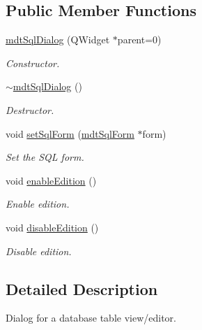 \subsection*{Public Member Functions}
\begin{DoxyCompactItemize}
\item 
\hypertarget{classmdt_sql_dialog_a9588f53afba818d79ff0f2e9eaeed50f}{
\hyperlink{classmdt_sql_dialog_a9588f53afba818d79ff0f2e9eaeed50f}{mdtSqlDialog} (QWidget $\ast$parent=0)}
\label{classmdt_sql_dialog_a9588f53afba818d79ff0f2e9eaeed50f}

\begin{DoxyCompactList}\small\item\em Constructor. \end{DoxyCompactList}\item 
\hypertarget{classmdt_sql_dialog_a845d9f4eef1c590d5e854540e18b00a6}{
\hyperlink{classmdt_sql_dialog_a845d9f4eef1c590d5e854540e18b00a6}{$\sim$mdtSqlDialog} ()}
\label{classmdt_sql_dialog_a845d9f4eef1c590d5e854540e18b00a6}

\begin{DoxyCompactList}\small\item\em Destructor. \end{DoxyCompactList}\item 
void \hyperlink{classmdt_sql_dialog_aa4b143efbe21073e1668d75cdf262a39}{setSqlForm} (\hyperlink{classmdt_sql_form}{mdtSqlForm} $\ast$form)
\begin{DoxyCompactList}\small\item\em Set the SQL form. \end{DoxyCompactList}\item 
void \hyperlink{classmdt_sql_dialog_a47de595aa2a117cdc3eb5de4a6bbf8f5}{enableEdition} ()
\begin{DoxyCompactList}\small\item\em Enable edition. \end{DoxyCompactList}\item 
void \hyperlink{classmdt_sql_dialog_a22e77e80b419d9bb23703c253b1a246e}{disableEdition} ()
\begin{DoxyCompactList}\small\item\em Disable edition. \end{DoxyCompactList}\end{DoxyCompactItemize}


\subsection{Detailed Description}
Dialog for a database table view/editor. 

